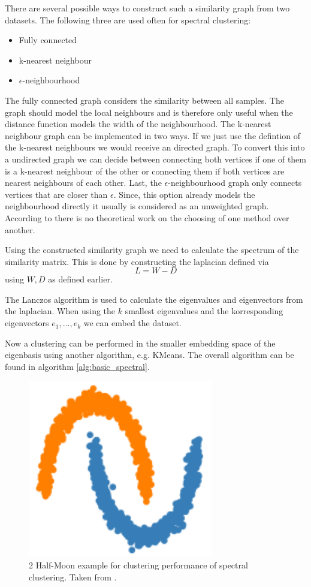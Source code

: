 There are several possible ways to construct such a similarity graph from two datasets.
The following three are used often for spectral clustering:
\begin{itemize}
  \item Fully connected
  \item k-nearest neighbour
  \item \(\epsilon\)-neighbourhood
\end{itemize}
The fully connected graph considers the similarity between all samples. The graph should model the local neighbours and is therefore only useful when the distance function
models the width of the neighbourhood.
The k-nearest neighbour graph can be implemented in two ways. If we just use the defintion of the k-nearest neighbours we would receive an directed graph.
To convert this into a undirected graph we can decide between connecting both vertices if one of them is a k-nearest neighbour of the other or connecting them if both vertices are nearest neighbours of each other.
Last, the \(\epsilon\)-neighbourhood graph only connects vertices that are closer than \(\epsilon\).
Since, this option already models the neighbourhood directly it usually is considered as an unweighted graph. \cite{von_luxburg_tutorial_2007}
According to \cite{von_luxburg_tutorial_2007} there is no theoretical work on the choosing of one method over
another.

Using the constructed similarity graph we need to calculate the spectrum of the similarity matrix.
This is done by constructing the laplacian defined via
\[L = W - D\]
using \(W, D\) as defined earlier.

The Lanczos algorithm \cite{lanczos_iteration_1950} is used to calculate the eigenvalues and eigenvectors from the laplacian.
When using the \(k\) smallest eigenvalues and the korresponding eigenvectors \(e_1, \ldots, e_k\) we can embed the dataset.

Now a clustering can be performed in the smaller embedding space of the eigenbasis using another algorithm, e.g. KMeans.
The overall algorithm can be found in algorithm \ref{alg:basic_spectral}.

\begin{figure}
  \includegraphics{images/spectral_example.png}
  \caption{2 Half-Moon example for clustering performance of spectral clustering. Taken from \cite{noauthor_23_2020}.}
  \label{fig:spectral_example}
\end{figure}

